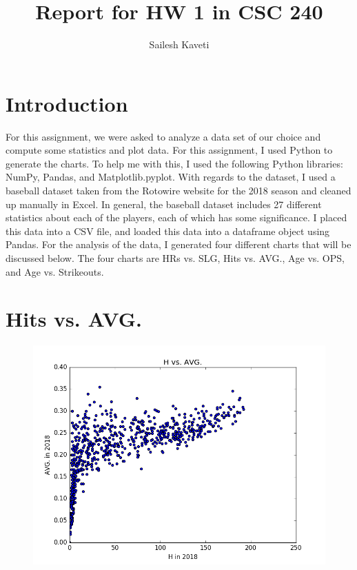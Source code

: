 \documentclass{acmart}
\title{Report for HW 1 in CSC 240}
\author{Sailesh Kaveti}
\begin{document}
\maketitle

\section*{Introduction}

For this assignment, we were asked to analyze a data set of our choice and compute some statistics and plot data. For this assignment, I used Python to generate the charts. To help me with this, I used the following Python libraries: NumPy, Pandas, and Matplotlib.pyplot. With regards to the dataset, I used a baseball dataset taken from the Rotowire website for the 2018 season and cleaned up manually in Excel. In general, the baseball dataset includes 27 different statistics about each of the players, each of which has some significance. I placed this data into a CSV file, and loaded this data into a dataframe object using Pandas. For the analysis of the data, I generated four different charts that will be discussed below. The four charts are HRs vs. SLG, Hits vs. AVG., Age vs. OPS, and Age vs. Strikeouts.

\section*{Hits vs. AVG.}

\begin{figure}[H]
\includegraphics[scale=.5]{HvsAVG.png}
\end{figure}
\end{document}

